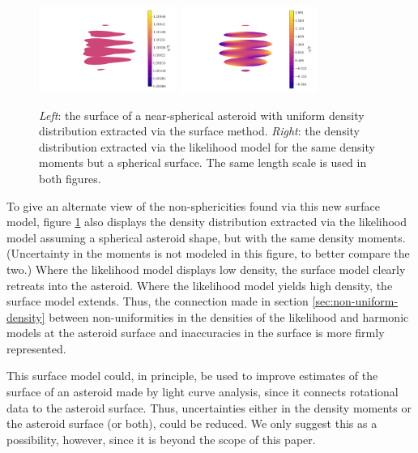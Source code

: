 \documentclass[fleqn,usenatbib]{mnras}
\begin{document}
\begin{figure}
  \centering
  \hfill
  \includegraphics[width=0.4\textwidth]{figs/high-surface.pdf}\hfill
  \includegraphics[width=0.4\textwidth]{figs/high-likelihood.pdf}\hfill
  \caption{\textit{Left}: the surface of a near-spherical asteroid with uniform density distribution extracted via the surface method. \textit{Right}: the density distribution extracted via the likelihood model for the same density moments but a spherical surface. The same length scale is used in both figures.}
  \label{fig:surface-density}
\end{figure}

To give an alternate view of the non-sphericities found via this new surface model, figure \ref{fig:surface-density} also displays the density distribution extracted via the likelihood model assuming a spherical asteroid shape, but with the same density moments. (Uncertainty in the moments is not modeled in this figure, to better compare the two.) Where the likelihood model displays low density, the surface model clearly retreats into the asteroid. Where the likelihood model yields high density, the surface model extends. Thus, the connection made in section \ref{sec:non-uniform-density} between non-uniformities in the densities of the likelihood and harmonic models at the asteroid surface and inaccuracies in the surface is more firmly represented.

This surface model could, in principle, be used to improve estimates of the surface of an asteroid made by light curve analysis, since it connects rotational data to the asteroid surface. Thus, uncertainties either in the density moments or the asteroid surface (or both), could be reduced. We only suggest this as a possibility, however, since it is beyond the scope of this paper.
\end{document}
